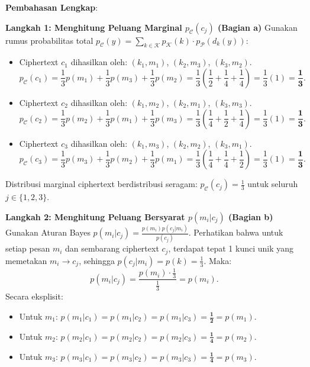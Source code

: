 \documentclass[11pt,a4paper]{article}
\begin{document}
\noindent\textbf{Pembahasan Lengkap}:

\noindent\textbf{Langkah 1: Menghitung Peluang Marginal $p_{\mathcal{C}}(c_j)$ (Bagian a)}
Gunakan rumus probabilitas total $p_{\mathcal{C}}(y) = \sum_{k \in \mathcal{K}} p_{\mathcal{K}}(k) \cdot p_{\mathcal{P}}(d_k(y))$:
\begin{itemize}
    \item Ciphertext $c_1$ dihasilkan oleh: $(k_1, m_1)$, $(k_2, m_3)$, $(k_3, m_2)$.
    \[
    p_{\mathcal{C}}(c_1) = \frac{1}{3} p(m_1) + \frac{1}{3} p(m_3) + \frac{1}{3} p(m_2) = \frac{1}{3}\left(\frac{1}{2} + \frac{1}{4} + \frac{1}{4}\right) = \frac{1}{3}(1) = \mathbf{\frac{1}{3}}.
    \]
    \item Ciphertext $c_2$ dihasilkan oleh: $(k_1, m_2)$, $(k_2, m_1)$, $(k_3, m_3)$.
    \[
    p_{\mathcal{C}}(c_2) = \frac{1}{3} p(m_2) + \frac{1}{3} p(m_1) + \frac{1}{3} p(m_3) = \frac{1}{3}\left(\frac{1}{4} + \frac{1}{2} + \frac{1}{4}\right) = \frac{1}{3}(1) = \mathbf{\frac{1}{3}}.
    \]
    \item Ciphertext $c_3$ dihasilkan oleh: $(k_1, m_3)$, $(k_2, m_2)$, $(k_3, m_1)$.
    \[
    p_{\mathcal{C}}(c_3) = \frac{1}{3} p(m_3) + \frac{1}{3} p(m_2) + \frac{1}{3} p(m_1) = \frac{1}{3}\left(\frac{1}{4} + \frac{1}{4} + \frac{1}{2}\right) = \frac{1}{3}(1) = \mathbf{\frac{1}{3}}.
    \]
\end{itemize}
Distribusi marginal ciphertext berdistribusi seragam: $p_{\mathcal{C}}(c_j) = \frac{1}{3}$ untuk seluruh $j \in \{1, 2, 3\}$.

\noindent\textbf{Langkah 2: Menghitung Peluang Bersyarat $p(m_i | c_j)$ (Bagian b)}
Gunakan Aturan Bayes $p(m_i | c_j) = \frac{p(m_i) p(c_j | m_i)}{p(c_j)}$.
Perhatikan bahwa untuk setiap pesan $m_i$ dan sembarang ciphertext $c_j$, terdapat tepat 1 kunci unik yang memetakan $m_i \to c_j$, sehingga $p(c_j | m_i) = p(k) = \frac{1}{3}$.
Maka:
\[
p(m_i | c_j) = \frac{p(m_i) \cdot \frac{1}{3}}{\frac{1}{3}} = p(m_i).
\]
Secara eksplisit:
\begin{itemize}
    \item Untuk $m_1$: $p(m_1 | c_1) = p(m_1 | c_2) = p(m_1 | c_3) = \mathbf{\frac{1}{2}} = p(m_1)$.
    \item Untuk $m_2$: $p(m_2 | c_1) = p(m_2 | c_2) = p(m_2 | c_3) = \mathbf{\frac{1}{4}} = p(m_2)$.
    \item Untuk $m_3$: $p(m_3 | c_1) = p(m_3 | c_2) = p(m_3 | c_3) = \mathbf{\frac{1}{4}} = p(m_3)$.
\end{itemize}
\end{document}
